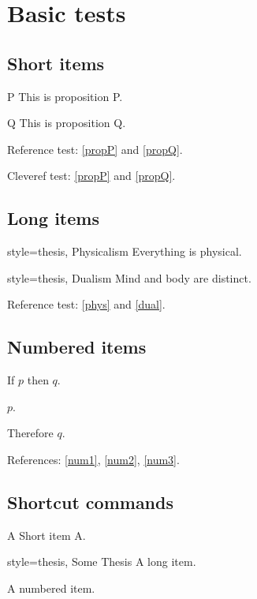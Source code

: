 \documentclass[leqno]{article}
\begin{document}
\section{Basic tests}

\subsection{Short items}

\begin{prop}
  \item[P] This is proposition P. \label{propP}
  \item[Q] This is proposition Q. \label{propQ}
\end{prop}

Reference test: \ref{propP} and \ref{propQ}.

Cleveref test: \cref{propP} and \cref{propQ}.

\subsection{Long items}

\begin{prop}
  \item[style=thesis, Physicalism] Everything is physical. \label{phys}
  \item[style=thesis, Dualism] Mind and body are distinct. \label{dual}
\end{prop}

Reference test: \ref{phys} and \ref{dual}.

\subsection{Numbered items}

\begin{prop}
  \item If $p$ then $q$. \label{num1}
  \item $p$. \label{num2}
  \item Therefore $q$. \label{num3}
\end{prop}

References: \ref{num1}, \ref{num2}, \ref{num3}.

\subsection{Shortcut commands}

\begin{prop}
  \item[A] Short item A. \label{shortA}
  \item[style=thesis, Some Thesis] A long item. \label{longthesis}
  \item A numbered item. \label{numshort}
\end{prop}
\end{document}
